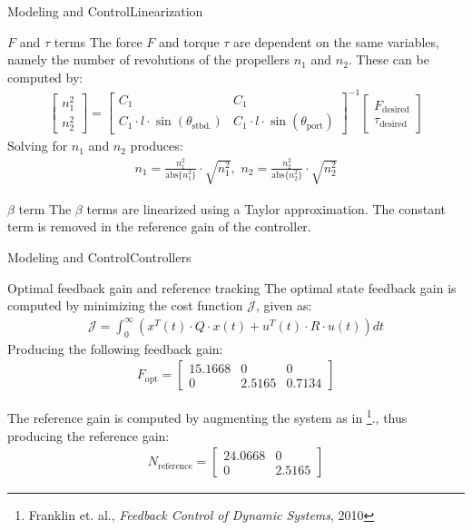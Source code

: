 \documentclass[10pt]{beamer}
\begin{document}
\begin{frame}{Modeling and Control}{Linearization}
  \begin{block}{$F$ and $\tau$ terms}
  The force $F$ and torque $\tau$ are dependent on the same variables, namely the number of revolutions of the propellers $n_1$ and $n_2$. These can be computed by:
  \begin{align}
\begin{bmatrix}
n_1^2\\
n_2^2
\end{bmatrix} = \begin{bmatrix}
C_1 & C_1\\
C_1 \cdot l \cdot \sin(\theta_\text{stbd.}) & C_1 \cdot l \cdot \sin(\theta_\text{port})
\end{bmatrix}^{-1}\begin{bmatrix}
F_\text{desired}\\
\tau_\text{desired}
\end{bmatrix}\label{eq:solver}
\end{align}
Solving for $n_1$ and $n_2$ produces:
\begin{align}
n_1 = \frac{n_1^2}{\text{abs}\{n_1^2\}} \cdot \sqrt{n_1^2},\,\, n_2 = \frac{n_2^2}{\text{abs}\{n_2^2\}} \cdot \sqrt{n_2^2}
\end{align}
  \end{block}
  \begin{block}{$\beta$ term}
  The $\beta$ terms are linearized using a Taylor approximation. The constant term is removed in the reference gain of the controller.
  \end{block}
\end{frame}

\begin{frame}{Modeling and Control}{Controllers}
\begin{block}{Optimal feedback gain and reference tracking}
The optimal state feedback gain is computed by minimizing the cost function $\mathcal{J}$, given as:
\begin{align}
\mathcal{J} = \int_0^\infty (x^T(t)\cdot Q\cdot x(t) + u^T(t) \cdot R \cdot u(t))dt
\end{align}
Producing the following feedback gain:
\begin{align}
F_\text{opt} = \begin{bmatrix}
15.1668 & 0 & 0\\
0 & 2.5165 & 0.7134
\end{bmatrix}
\end{align}
\end{block}
The reference gain is computed by augmenting the system as in \footnote{Franklin et. al., \textit{Feedback Control of Dynamic Systems}, 2010}., thus producing the reference gain:
\begin{align}
N_\text{reference} = \begin{bmatrix}
24.0668 & 0\\
0 & 2.5165 \end{bmatrix}
\end{align}
\end{frame}
\end{document}
